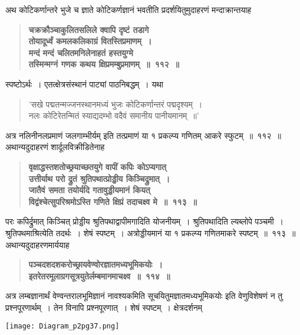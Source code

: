 \documentclass[11pt, openany]{book}
\begin{document}
\begin{sloppypar}
{\small अथ कोटिकर्णान्तरे भुजे च ज्ञाते कोटिकर्णज्ञानं भवतीति प्रदर्शयितुमुदाहरणं मन्दाक्रान्तयाह\textendash }

 \label{7.112}
\begin{quote}
{\large \textbf{{\color{purple}चक्रक्रौञ्चाकुलितसलिले क्वापि दृष्टं तडागे\\
तोयादूर्ध्वं कमलकलिकाग्रं वितस्तिप्रमाणम्~।\\
मन्दं मन्दं चलितमनिलेनाहतं हस्तयुग्मे\\
तस्मिन्मग्नं गणक कथय क्षिप्रमम्बुप्रमाणम्~॥~११२~॥}}}
\end{quote}
\end{sloppypar}

\newpage

\begin{sloppypar}
स्पष्टोऽर्थः~। एतत्क्षेत्रसंस्थानं {\color{violet}पाट्यां} पाठनिबद्धम्~। यथा\textendash

\begin{quote}
{\color{violet}'सखे पद्मतन्मज्जनस्थानमध्यं भुजः कोटिकर्णान्तरं पद्मदृश्यम्~।\\
नलः कोटिरेतन्मितं स्याद्यदम्भो वदैवं समानीय पानीयमानम्~॥'}
\end{quote}

अत्र नलिनीनलप्रमाणं जलगाम्भीर्यम् इति तत्प्रमाणं या १ प्रकल्प्य गणितम् आकरे स्फुटम्~॥~११२~॥\\

{\small अथान्यदुदाहरणं शार्दूलविक्रीडितेनाह\textendash }

 \label{7.113}
\begin{quote}
{\large \textbf{{\color{purple}वृक्षाद्धस्तशतोच्छ्रयाच्छतयुगे वापीं कपिः कोऽप्यगात्\\
उत्तीर्याथ परो द्रुतं श्रुतिपथात्प्रोड्डीय किञ्चिद्रुमात्~।\\
जातैवं समता तयोर्यदि गतावुड्डीयमानं कियत्\\
विद्वंश्चेत्सुपरिश्रमोऽस्ति गणिते क्षिप्रं तदाचक्ष्व मे~॥~११३~॥}}}
\end{quote}

परः कपिर्द्रुमात् किञ्चित् प्रोड्डीय श्रुतिपथाद्वापीमगादिति योजनीयम्~। श्रुतिपथादिति ल्यब्लोपे पञ्चमी~। श्रुतिपथमाश्रित्येति तदर्थः~। शेषं स्पष्टम्~। अत्रोड्डीयमानं या १ प्रकल्प्य गणितमाकरे स्पष्टम्~॥~११३~॥\\

{\small अथान्यदुदाहरणमार्ययाह\textendash }

 \label{7.114}
\begin{quote}
{\large \textbf{{\color{purple}पञ्चदशदशकरोच्छ्रायवेण्वोरज्ञातमध्यभूमिकयोः~।\\
इतरेतरमूलाग्रगसूत्रयुतेर्लम्बमानमाचक्ष्व~॥~११४~॥}}}
\end{quote}

अत्र लम्बज्ञानार्थं वेण्वन्तरालभूमिज्ञानं नावश्यकमिति सूचयितुमज्ञातमध्यभूमिकयोः इति वेणुविशेषणं न तु प्रश्नपूरणार्थम्~। तेन विनापि प्रश्नपूरणात्~। शेषं स्पष्टम्~। क्षेत्रदर्शनम्\textendash 

\begin{center}
\texttt{[image: Diagram\_p2pg37.png]}
\end{center}
\end{sloppypar}
\end{document}
